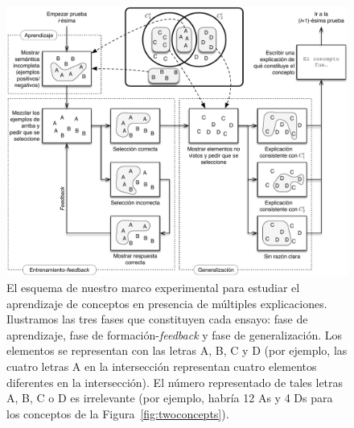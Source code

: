 \begin{figure}[t]
\begin{center}
	\includegraphics[scale=.7]{../figuras/brm/experimentscheme2_sp.pdf}
\end{center}\caption{
El esquema de nuestro marco experimental para estudiar el aprendizaje de conceptos en presencia de múltiples explicaciones. Ilustramos las tres fases que constituyen cada ensayo: fase de aprendizaje, fase de formación-{\em feedback} y fase de generalización. Los elementos se representan con las letras {\sf A}, {\sf B}, {\sf C} y {\sf D} (por ejemplo, las cuatro letras {\sf A} en la intersección representan cuatro elementos diferentes en la intersección). El número representado de tales letras {\sf A}, {\sf B}, {\sf C} o {\sf D} es irrelevante (por ejemplo, habría 12 {\sf A}s y 4 {\sf D}s para los conceptos de la Figura~\ref{fig:twoconcepts}).
}
\label{fig:trials}
\end{figure}

